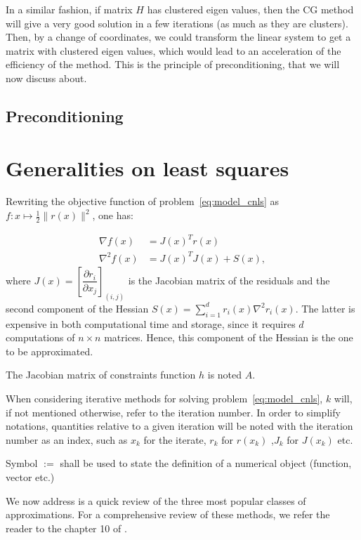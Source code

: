 \documentclass[10pt]{article}
\numberwithin{equation}{section}
\begin{document}
	 In a similar fashion, if matrix $H$ has clustered eigen values, then the CG method will give a very good solution in a few iterations (as much as they are clusters). Then, by a change of coordinates, we could transform the linear system to get a matrix with clustered eigen values, which would lead to an acceleration of the efficiency of the method. This is the principle of preconditioning, that we will now discuss about.
	 
	 \subsection{Preconditioning}
	
	\section{Generalities on least squares}
	 
	 Rewriting the objective function of problem~\eqref{eq:model_cnls} as $f\colon x \mapsto  \frac{1}{2} \|r(x)\|^2$, one has:
	 
	 \begin{subequations}
	 		\begin{align}
	 		\nabla f(x) &= J(x)^Tr(x)\label{subeq:ls_grad} \\
	 		\nabla^2 f(x) &= J(x)^TJ(x) + S(x) , \label{subeq:ls_hessian}
	 		\end{align}
	 \end{subequations}
	 where $J(x) = \left[\dfrac{\partial r_i}{\partial x_j}\right]_{(i,j)}$ is the Jacobian matrix of the residuals and the second component of the Hessian $S(x) = \sum_{i=1}^{d} r_i(x) \nabla^2r_i(x) $. The latter is expensive in both computational time and storage, since it requires $d$ computations of $n\times n$ matrices. Hence, this component of the Hessian is the one to be approximated. 
	 
	 The Jacobian matrix of constraints function $h$ is noted $A$.
	 
	 When considering iterative methods for solving problem~\eqref{eq:model_cnls}, $k$ will, if not mentioned otherwise, refer to the iteration number. In order to simplify notations, quantities relative to a given iteration will be noted with the iteration number as an index, such as $x_k$ for the iterate, $r_k$ for $r(x_k)$ ,$J_k$ for $J(x_k)$ etc.
	 
	 Symbol $:=$ shall be used to state the definition of a numerical object (function, vector etc.)
	 
	 We now address is a quick review of the three most popular classes of approximations. For a comprehensive review of these methods, we refer the reader to the chapter 10 of \cite{dennisschnabel:1996}.
	 
\end{document}
